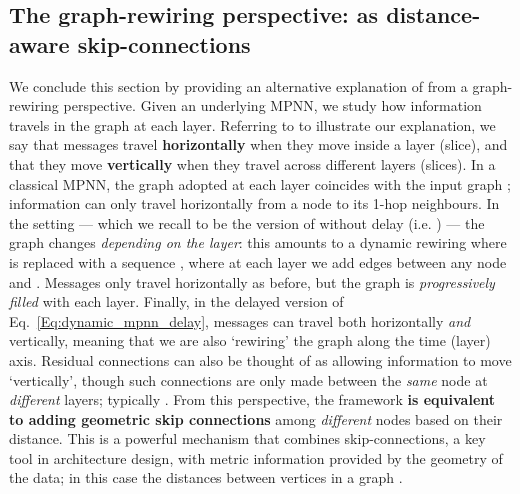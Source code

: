 \documentclass{article}
\theoremstyle{plain}
\theoremstyle{definition}
\theoremstyle{remark}
\begin{document}
\subsection{The graph-rewiring perspective:  as distance-aware skip-connections}\label{subsec:rewiring}
We conclude this section by providing an alternative explanation of  from a graph-rewiring perspective. Given an underlying MPNN, we study how information travels in the graph at each layer.
Referring to  to illustrate our explanation,
we say that messages travel {\bf horizontally} when they move inside a layer (slice), and that they move {\bf vertically} when they travel across different layers (slices). In a classical MPNN, the graph adopted at each layer coincides with the input graph ; information can only travel horizontally from a node to its 1-hop neighbours. In the  setting --- which we recall to be the version of  without delay (i.e. ) --- the graph changes {\em depending on the layer}: this amounts to a dynamic rewiring where  is replaced with a sequence , where at each layer  we add edges between any node  and . Messages only travel horizontally as before, but the  graph is {\em progressively filled} with each layer.
Finally, in the delayed version of Eq.~\eqref{Eq:dynamic_mpnn_delay}, messages can travel both horizontally {\em and} vertically, meaning that we are also `rewiring' the graph along the time (layer) axis.
Residual connections can also be thought of as allowing information to move `vertically', though such connections are only made between the \emph{same} node  at \emph{different} layers; typically . From this perspective, the  framework {\bf is equivalent to adding geometric skip connections} among \emph{different} nodes based on their distance. This is a powerful mechanism that combines skip-connections, a key tool in architecture design, with metric information provided by the geometry of the data; in this case the distances between vertices in a graph .
\end{document}
